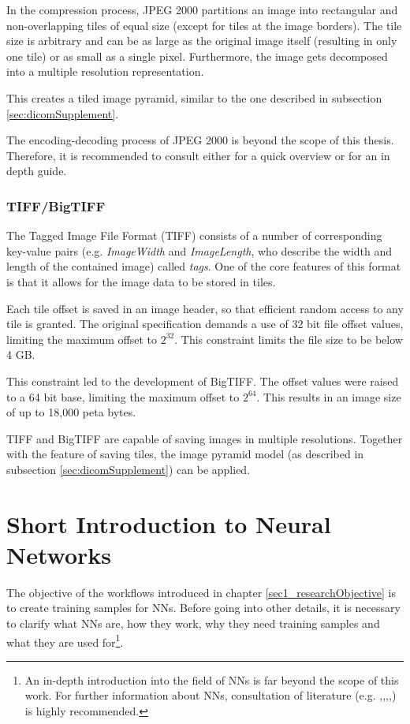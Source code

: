 In the compression process, JPEG 2000 partitions an image into rectangular and non-overlapping tiles of equal size (except for tiles at the image borders). The tile size is arbitrary and
can be as large as the original image itself (resulting in only one tile) or as small as a single pixel. Furthermore, the image gets decomposed into a multiple resolution representation\cite{Rabbani02}. 

This creates a tiled image pyramid, similar to the one described in subsection \ref{sec:dicomSupplement}.

The encoding-decoding process of JPEG 2000 is beyond the scope of this thesis. Therefore, it is recommended to consult either \cite{intoPix08} for a quick overview or \cite{Rabbani02} for an in depth guide.


\subsubsection{TIFF/BigTIFF}
The Tagged Image File Format (TIFF) consists of a number of corresponding key-value pairs (e.g. \emph{ImageWidth} and \emph{ImageLength}, who describe the width and length of the contained image) called \emph{tags}. One of the core features of this format is that it allows for the image data to be stored in tiles\cite{Eddins07}.

Each tile offset is saved in an image header, so that efficient random access to any tile is granted. The original specification demands a use of 32 bit file offset values, limiting the maximum offset to $2^{32}$. This constraint limits the file size to be below 4 GB\cite{Eddins07}.

This constraint led to the development of BigTIFF. The offset values were raised to a 64 bit base, limiting the maximum offset to $2^{64}$. This results in an image size of up to 18,000 peta bytes\cite{web:digitalpreservation}.

TIFF and BigTIFF are capable of saving images in multiple resolutions. Together with the feature of saving tiles, the image pyramid model (as described in subsection \ref{sec:dicomSupplement}) can be applied\cite{web:digitalpreservation2}. 


\section{Short Introduction to Neural Networks}
The objective of the workflows introduced in chapter \ref{sec1_researchObjective} is to create training samples for NNs. Before going into other details, it is necessary to clarify what NNs are, how they work, why they need training samples and what they are used for\footnote{
	An in-depth introduction into the field of NNs is far beyond the scope of this work. For further information about NNs, consultation of literature (e.g. \cite{Stergiou96},\cite{Bourg04},\cite{Egmont-Petersen02},\cite{Kriesel07},\cite{Shiffman12}) is highly recommended.}.

